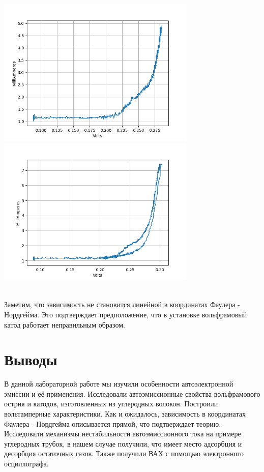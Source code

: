 \documentclass[12pt,a4paper]{article}
\begin{document}
\begin{flofigure}
    \centering
    \includegraphics[width=9.5cm]{ВАХ(обычный).png}
    \includegraphics[width=9.5cm]{ВАХ(пробой).png}
    \label{fig:my_label}
\end{flofigure}\\

Заметим, что зависимость не становится линейной в координатах Фаулера - Нордгейма. Это подтверждает предположение, что в установке вольфрамовый катод работает неправильным образом.

\section{Выводы}

В данной лабораторной работе мы изучили особенности автоэлектронной эмиссии и её применения. Исследовали автоэмиссионные свойства вольфрамового острия и катодов, изготовленных из углеродных волокон. Построили вольтамперные характеристики. Как и ожидалось, зависимость в координатах Фаулера - Нордгейма описывается прямой, что подтверждает теорию. Исследовали механизмы нестабильности автоэмиссионного тока на примере углеродных трубок, в нашем случае получили, что имеет место адсорбция и десорбция остаточных газов. 
Также получили ВАХ с помощью электронного осциллографа.
\end{document}
